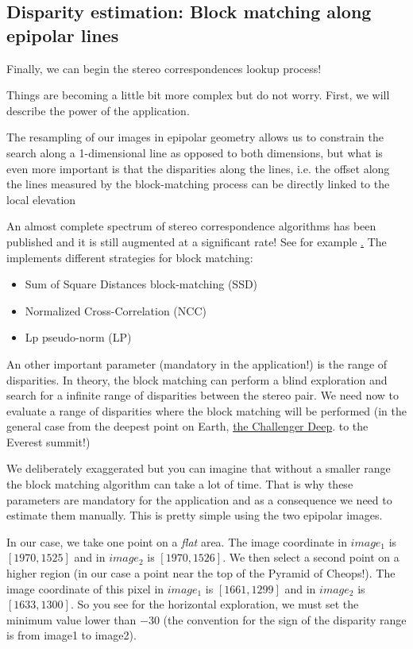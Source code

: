 \subsection{Disparity estimation: Block matching along epipolar lines}

Finally, we can begin the stereo correspondences lookup process!

Things are becoming a little bit more complex but do not worry. First,
we will describe the power of the 
application.

The resampling of our images in epipolar geometry allows us to
constrain the search along a 1-dimensional line as opposed to both
dimensions, but what is even more important is that the disparities
along the lines, i.e. the offset along the lines measured by the
block-matching process can be directly linked to the local elevation

An almost complete spectrum of stereo correspondence algorithms has been
published and it is still augmented at a significant rate!
See for example \href{http://en.wikipedia.org/wiki/Block-matching_algorithm}. The
\otb implements different strategies for block matching:

\begin{itemize}
\item Sum of Square Distances block-matching (SSD)
\item Normalized Cross-Correlation (NCC)
\item Lp pseudo-norm (LP)
\end{itemize}

An other important parameter (mandatory in the application!) is the
range of disparities. In theory, the block matching can perform a
blind exploration and search for a infinite range of disparities
between the stereo pair. We need now to evaluate a range of
disparities where the block matching will be performed (in the general
case from the deepest point on
Earth, \href{http://en.wikipedia.org/wiki/Challenger_Deep}{the
Challenger Deep}.  to the Everest summit!)

We deliberately exaggerated but you can imagine that without a smaller
range the block matching algorithm can take a lot of time.  That is why
these parameters are mandatory for the application and as a
consequence we need to estimate them manually. This is pretty simple
using the two epipolar images.

In our case, we take one point on a \textit{flat} area. The image coordinate in $image_{1}$
is $[1970,1525]$ and in $image_{2}$ is $[1970,1526]$. We then select a second
point on a higher region (in our case a point near the top of the Pyramid of
Cheops!). The image coordinate of this pixel in $image_{1}$ is $[1661,1299]$ and
in $image_{2}$ is $[1633,1300]$.  So you see for the horizontal exploration, we
must set the minimum value lower than $-30$ (the convention for the sign of the
disparity range is from image1 to image2).

